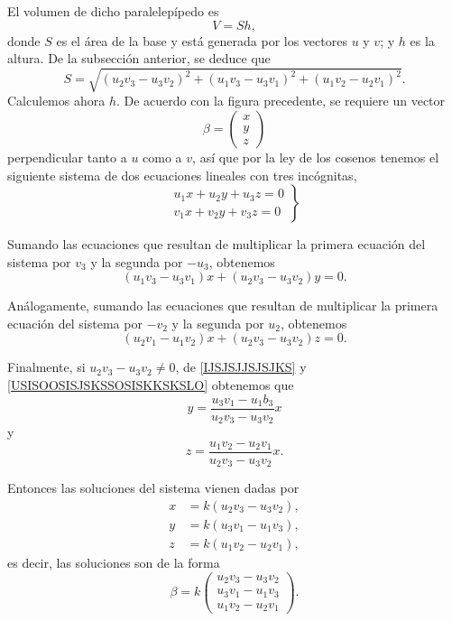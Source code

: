 El volumen de dicho paralelepípedo es
$$V=S h,$$
donde $S$ es el área de la base y está generada por los vectores $u$ y $v$; y $h$ es la altura. De la subsección anterior, se deduce que
$$ S=\sqrt{\left(u_2 v_3-u_3 v_2\right)^2+\left(u_1 v_3-u_3 v_1\right)^2+\left(u_1 v_2-u_2 v_1\right)^2}.$$
Calculemos ahora $h$. De acuerdo con la figura precedente, se requiere un vector
$$\beta = \begin{pmatrix}
    x \\
    y \\
    z
\end{pmatrix}$$
perpendicular tanto a $u$ como a $v$, así que por la ley de los cosenos tenemos el siguiente sistema de dos ecuaciones lineales con tres incógnitas,
$$ \left.\begin{array}{r} u_1 x+u_2 y+u_3 z=0 \\ v_1 x+v_2 y+v_3 z=0 \end{array}\right\}$$ 

Sumando las ecuaciones que resultan de multiplicar la primera ecuación del sistema por $v_3$ y la segunda por $-u_3$, obtenemos
\begin{equation}
    \left(u_1 v_3-u_3 v_1\right) x+\left(u_2 v_3-u_3 v_2\right) y=0. \label{IJSJSJJSJSJKS}
\end{equation}

Análogamente, sumando las ecuaciones que resultan de multiplicar la primera ecuación del sistema por $-v_2$ y la segunda por $u_2$, obtenemos
\begin{equation}
    \left(u_2 v_1-u_1 v_2\right) x+\left(u_2 v_3-u_3 v_2\right) z=0. \label{USISOOSISJSKSSOSISKKSKSLO}
\end{equation}

Finalmente, si $u_2 v_3-u_3 v_2 \neq 0$, de \eqref{IJSJSJJSJSJKS} y \eqref{USISOOSISJSKSSOSISKKSKSLO} obtenemos que
$$y=\frac{u_3 v_1-u_1 b_3}{u_2 v_3-u_3 v_2} x $$
y
$$z=\frac{u_1 v_2-u_2 v_1}{u_2 v_3-u_3 v_2} x .$$

Entonces las soluciones del sistema vienen dadas por
$$ \begin{aligned} x & =k\left(u_2 v_3-u_3 v_2\right), \\ y & =k\left(u_3 v_1-u_1 v_3\right), \\ z & =k\left(u_1 v_2-u_2 v_1\right), \end{aligned} $$\newpage\noindent
es decir, las soluciones son de la forma $$\beta = k \begin{pmatrix}
    u_2 v_3-u_3 v_2 \\
    u_3 v_1-u_1 v_3 \\
    u_1 v_2-u_2 v_1
\end{pmatrix}.$$

